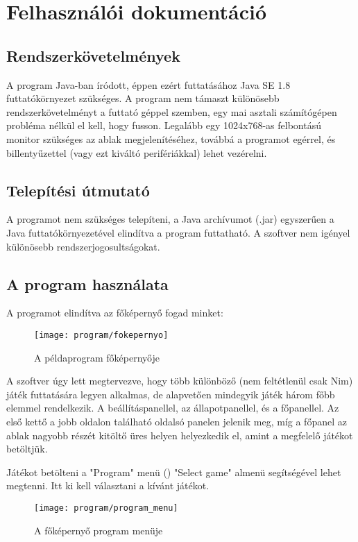 
\section{Felhasználói dokumentáció}
\subsection{Rendszerkövetelmények}
A program Java-ban íródott, éppen ezért futtatásához Java SE 1.8 futtatókörnyezet szükséges. A program nem támaszt különösebb rendszerkövetelményt a futtató géppel szemben, egy mai asztali számítógépen probléma nélkül el kell, hogy fusson. Legalább egy 1024x768-as felbontású monitor szükséges az ablak megjelenítéséhez, továbbá a programot egérrel, és billentyűzettel (vagy ezt kiváltó perifériákkal) lehet vezérelni.

\subsection{Telepítési útmutató}
A programot nem szükséges telepíteni, a Java archívumot (.jar) egyszerűen a Java futtatókörnyezetével elindítva a program futtatható. A szoftver nem igényel különösebb rendszerjogosultságokat.

\subsection{A program használata}
A programot elindítva az  főképernyő fogad minket:\ujsor
\begin{figure}[ht]
	\texttt{[image: program/fokepernyo]}
	\centering
	\caption{A példaprogram főképernyője}
	\label{fig:fokepernyo}
\end{figure}

A szoftver úgy lett megtervezve, hogy több különböző (nem feltétlenül csak Nim) játék futtatására legyen alkalmas, de alapvetően mindegyik játék három főbb elemmel rendelkezik. A beállításpanellel, az állapotpanellel, és a főpanellel. Az első kettő a jobb oldalon található oldalsó panelen jelenik meg, míg a főpanel az ablak nagyobb részét kitöltő üres helyen helyezkedik el, amint a megfelelő játékot betöltjük. \ujsor

Játékot betölteni a "Program" menü () "Select game" almenü segítségével lehet megtenni. Itt ki kell választani a kívánt játékot. 
\begin{figure}[ht]
	\texttt{[image: program/program\_menu]}
	\centering
	\caption{A főképernyő program menüje}
	\label{fig:program_menu}
\end{figure}


